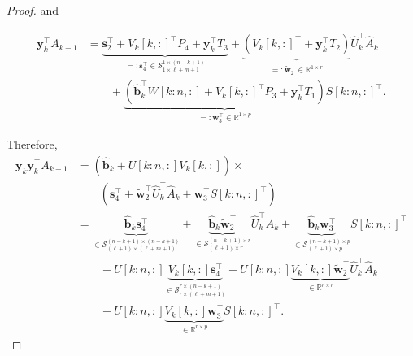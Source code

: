 \documentclass[a4paper,fleqn]{cas-sc}
\def\bbR{{\mathbb R}}
\def\calS{{\mathcal S}}
\def\bfy{{\mathbf y}}
\def\bfb{{\mathbf b}}
\def\bfs{{\mathbf s}}
\def\bfw{{\mathbf w}}
\begin{document}
\begin{proof}
and

\begin{align*}
\bfy_k^\top A_{k-1} &= 
\underbrace{\bfs_2^\top +V_k[k,:]^\top P_4+  \bfy_k^\top T_3}_{=: \bfs_4^\top \in \calS_{1 \times \ell+m+1}^{1 \times (n-k+1)}} + \underbrace{(V_k[k,:]^\top  + \bfy_k^\top T_2)}_{=: \tilde \bfw_2^\top \in \bbR^{1 \times r}} \hat U_k^\top \hat A_k\\
&\qquad + 
  \underbrace{(\hat \bfb_k^\top W[k\!:\!n,:] +V_k[k,:]^\top P_3+ \bfy_k^\top T_1)}_{=: \bfw_3^\top \in \bbR^{1 \times p}}  S[k\!:\!n,:]^\top.
\end{align*}

Therefore, 
\begin{align*}
\bfy_k \bfy_k^\top A_{k-1} &=
(\hat \bfb_k + U[k:n,:] V_k[k,:]) \times \\
&\qquad
(\bfs_4^\top + \tilde \bfw_2^\top \hat U_k^\top \hat A_k +
 \bfw_3^\top S[k:n,:]^\top ) \\
 &= \underbrace{\hat \bfb_k \bfs_4^\top}_{\in \calS_{(\ell+1) \times (\ell+m+1)}^{(n-k+1) \times (n-k+1)}}  + \underbrace{\hat \bfb_k \tilde \bfw_2^\top}_{\in \calS_{(\ell+1) \times r}^{(n-k+1) \times r}} \hat U_k^\top \hat A_k + 
 \underbrace{\hat \bfb_k \bfw_3^\top}_{\in \calS_{(\ell+1) \times p}^{(n-k+1) \times p}} S[k:n,:]^\top   \\
&\qquad + U[k:n,:] \underbrace{ V_k[k,:] \bfs_4^\top}_{\in \calS_{r \times (\ell+m+1)}^{r \times (n-k+1)}} + 
U[k:n,:] \underbrace{ V_k[k,:] \tilde \bfw_2^\top}_{\in \bbR^{r \times r}} \hat U_k^\top \hat A_k \\
&\qquad + U[k:n,:] \underbrace{ V_k[k,:] \bfw_3^\top}_{\in \bbR^{r \times p}} S[k:n,:]^\top.
\end{align*}


\end{proof}
\end{document}
